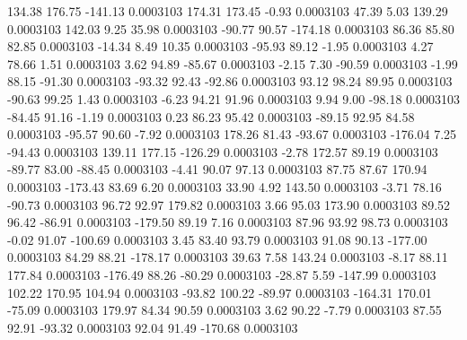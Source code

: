       134.38      176.75     -141.13     0.0003103
      174.31      173.45       -0.93     0.0003103
       47.39        5.03      139.29     0.0003103
      142.03        9.25       35.98     0.0003103
      -90.77       90.57     -174.18     0.0003103
       86.36       85.80       82.85     0.0003103
      -14.34        8.49       10.35     0.0003103
      -95.93       89.12       -1.95     0.0003103
        4.27       78.66        1.51     0.0003103
        3.62       94.89      -85.67     0.0003103
       -2.15        7.30      -90.59     0.0003103
       -1.99       88.15      -91.30     0.0003103
      -93.32       92.43      -92.86     0.0003103
       93.12       98.24       89.95     0.0003103
      -90.63       99.25        1.43     0.0003103
       -6.23       94.21       91.96     0.0003103
        9.94        9.00      -98.18     0.0003103
      -84.45       91.16       -1.19     0.0003103
        0.23       86.23       95.42     0.0003103
      -89.15       92.95       84.58     0.0003103
      -95.57       90.60       -7.92     0.0003103
      178.26       81.43      -93.67     0.0003103
     -176.04        7.25      -94.43     0.0003103
      139.11      177.15     -126.29     0.0003103
       -2.78      172.57       89.19     0.0003103
      -89.77       83.00      -88.45     0.0003103
       -4.41       90.07       97.13     0.0003103
       87.75       87.67      170.94     0.0003103
     -173.43       83.69        6.20     0.0003103
       33.90        4.92      143.50     0.0003103
       -3.71       78.16      -90.73     0.0003103
       96.72       92.97      179.82     0.0003103
        3.66       95.03      173.90     0.0003103
       89.52       96.42      -86.91     0.0003103
     -179.50       89.19        7.16     0.0003103
       87.96       93.92       98.73     0.0003103
       -0.02       91.07     -100.69     0.0003103
        3.45       83.40       93.79     0.0003103
       91.08       90.13     -177.00     0.0003103
       84.29       88.21     -178.17     0.0003103
       39.63        7.58      143.24     0.0003103
       -8.17       88.11      177.84     0.0003103
     -176.49       88.26      -80.29     0.0003103
      -28.87        5.59     -147.99     0.0003103
      102.22      170.95      104.94     0.0003103
      -93.82      100.22      -89.97     0.0003103
     -164.31      170.01      -75.09     0.0003103
      179.97       84.34       90.59     0.0003103
        3.62       90.22       -7.79     0.0003103
       87.55       92.91      -93.32     0.0003103
       92.04       91.49     -170.68     0.0003103
